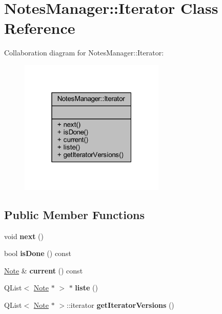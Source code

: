 \hypertarget{class_notes_manager_1_1_iterator}{}\section{Notes\+Manager\+:\+:Iterator Class Reference}
\label{class_notes_manager_1_1_iterator}


Collaboration diagram for Notes\+Manager\+:\+:Iterator\+:\nopagebreak
\begin{figure}[H]
\begin{center}
\leavevmode
\includegraphics[width=196pt]{class_notes_manager_1_1_iterator__coll__graph}
\end{center}
\end{figure}
\subsection*{Public Member Functions}
\begin{DoxyCompactItemize}
\item 
\mbox{\label{class_notes_manager_1_1_iterator_a1a79699fe56e691c3f1c72eb46703fc6}} 
void {\bfseries next} ()
\item 
\mbox{\label{class_notes_manager_1_1_iterator_ab9afd283687410c5591f97881ac17b29}} 
bool {\bfseries is\+Done} () const
\item 
\mbox{\label{class_notes_manager_1_1_iterator_aaf695d1b7faf4afa9a36115f5e9d3547}} 
\hyperlink{class_note}{Note} \& {\bfseries current} () const
\item 
\mbox{\label{class_notes_manager_1_1_iterator_ab64667e5cf5e2285761c6eaa12797a83}} 
Q\+List$<$ \hyperlink{class_note}{Note} $\ast$ $>$ $\ast$ {\bfseries liste} ()
\item 
\mbox{\label{class_notes_manager_1_1_iterator_ab0cfae90dcf5788e37f4bf84f5c58093}} 
Q\+List$<$ \hyperlink{class_note}{Note} $\ast$ $>$\+::iterator {\bfseries get\+Iterator\+Versions} ()
\end{DoxyCompactItemize}
